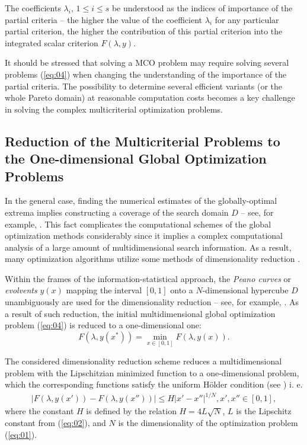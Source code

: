 \documentclass[procedia]{easychair}
\begin{document}
The coefficients $\lambda_i$, $1 \leq i \leq s$ be understood as the indices of importance of the partial criteria -- the higher the value of the coefficient $\lambda_i$ for any particular partial criterion, the higher the contribution of this partial criterion into the integrated scalar criterion $F(\lambda,y)$. \par
 
It should be stressed that solving a MCO problem may require solving several problems (\ref{eq:04}) when changing the understanding of the importance of the partial criteria. The possibility to determine several efficient variants (or the whole Pareto domain) at reasonable computation costs becomes a key challenge in solving the complex multicriterial optimization problems.



\subsection{Reduction of the Multicriterial Problems to the One-dimensional Global Optimization Problems}
\label{sect:3_2}
In the general case, finding the numerical estimates of the globally-optimal extrema implies constructing a coverage of the search domain $D$ -- see, for example, \cite{c9,c11,c28,c35,c33,c42}. This fact complicates the computational schemes of the global optimization methods considerably since it implies a complex computational analysis of a large amount of multidimensional search information. As a result, many optimization algorithms utilize some methods of dimensionality reduction \cite{c13,c28,c32,c35,c33}.\par

Within the frames of the information-statistical approach, the {\it Peano curves} or {\it evolvents} $y(x)$ mapping the interval $[0,1]$ onto a $N$-dimensional hypercube $D$ unambiguously are used for the dimensionality reduction -- see, for example, \cite{c32,c35,c33}. As a result of such reduction, the initial multidimensional global optimization problem (\ref{eq:04}) is reduced to a one-dimensional one:
\begin{equation} \label{eq:05}
F(\lambda,y(x^*)) = \min_{x \in [0,1]} {F(\lambda,y(x))}.
\end{equation}

The considered dimensionality reduction scheme reduces a multidimensional problem with the Lipschitzian minimized function to a one-dimensional problem, which the corresponding functions satisfy the uniform H\"{o}lder condition (see \cite{c35,c33}) i. e.
\begin{eqnarray} \label{eq:06}
|F(\lambda,y(x')) - F(\lambda,y(x''))| \leq H |x' - x''|^{1/N}, x', x'' \in [0,1], 
\end{eqnarray}
where the constant $H$ is defined by the relation  $H = 4L \sqrt{N}$, $L$ is the Lipschitz constant from (\ref{eq:02}), and $N$ is the dimensionality of the optimization problem (\ref{eq:01}). \par
\end{document}
